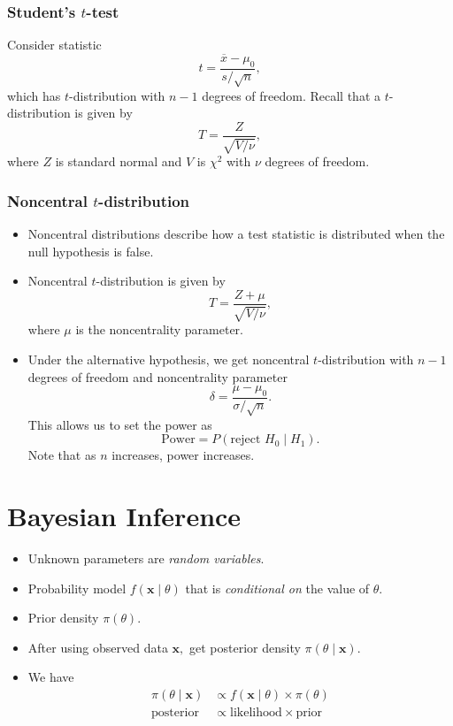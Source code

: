 \documentclass[../ds]{subfiles}
\begin{document}
\subsubsection{Student's $t$-test}
Consider statistic
\[ t = \frac{\overline{x} - \mu_0}{s/\sqrt{n}}, \]
which has $t$-distribution with $n-1$ degrees of freedom. Recall that a $t$-distribution is given by \[ T = \frac{Z}{\sqrt{V/\nu}}, \]
where $Z$ is standard normal and $V$ is $\chi^2$ with $\nu$ degrees of freedom.

\subsubsection{Noncentral $t$-distribution}
\begin{itemize}
	\item Noncentral distributions describe how a test statistic is distributed when the null hypothesis is false.
	\item Noncentral $t$-distribution is given by
	\[ T = \frac{Z+\mu}{\sqrt{V/\nu}}, \]
	where $\mu$ is the noncentrality parameter.
	\item Under the alternative hypothesis, we get noncentral $t$-distribution with $n-1$ degrees of freedom and noncentrality parameter
	\[ \delta = \frac{\mu - \mu_0}{\sigma/\sqrt{n}}. \]
	This allows us to set the power as
	\[ \text{Power} = P(\text{reject }H_0 \mid H_1). \]
	Note that as $n$ increases, power increases.
\end{itemize}

\section{Bayesian Inference}
\begin{itemize}
	\item Unknown parameters are \textit{random variables}.
	\item Probability model $f(\mathbf{x} \mid \theta)$ that is \textit{conditional on} the value of $\theta.$
	\item Prior density $\pi(\theta).$
	\item After using observed data $\mathbf{x},$ get posterior density $\pi(\theta \mid \mathbf{x}).$
	\item We have
	\begin{align*}
		\pi(\theta \mid \mathbf{x}) &\propto f(\mathbf{x} \mid \theta) \times \pi(\theta) \\
		\text{posterior} &\propto \text{likelihood} \times \text{prior}
	\end{align*}
\end{itemize}
\end{document}
